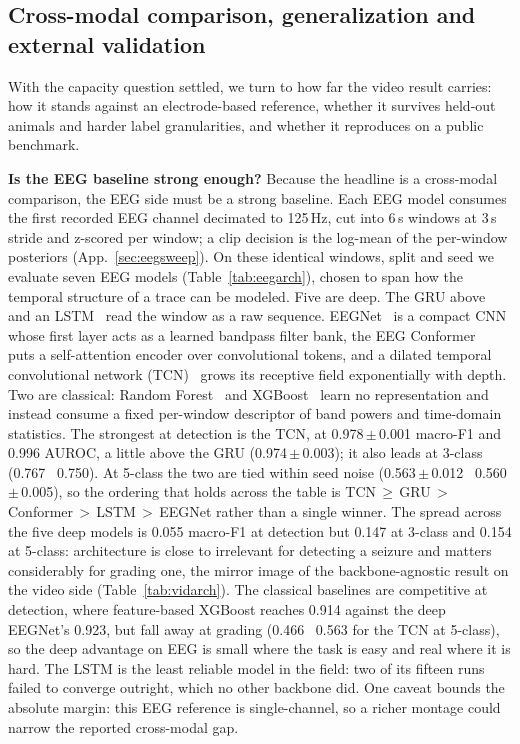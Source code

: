 \subsection{Cross-modal comparison, generalization and external validation}
\label{sec:crossmodal}

With the capacity question settled, we turn to how far the video result carries: how
it stands against an electrode-based reference, whether it survives held-out animals
and harder label granularities, and whether it reproduces on a public benchmark.

\noindent\textbf{Is the EEG baseline strong enough?}
Because the headline is a cross-modal comparison, the EEG side must be a strong
baseline. Each EEG model consumes the first recorded EEG channel decimated to
125\,Hz, cut into 6\,s windows at 3\,s stride and z-scored per window; a clip
decision is the log-mean of the per-window posteriors (App.~\ref{sec:eegsweep}). On these identical windows,
split and seed we evaluate seven EEG models (Table~\ref{tab:eegarch}), chosen to
span how the temporal structure of a trace can be modeled. Five are deep. The GRU above and an LSTM~\cite{hochreiter1997lstm} read the window as a raw sequence. EEGNet~\cite{lawhern2018eegnet} is a compact CNN whose first layer acts as a learned bandpass filter bank, the EEG Conformer~\cite{song2022conformer} puts a self-attention encoder over convolutional tokens, and a dilated temporal convolutional network (TCN)~\cite{bai2018tcn} grows its receptive field exponentially with depth. Two are classical: Random Forest~\cite{breiman2001rf} and
XGBoost~\cite{chen2016xgboost} learn no representation and instead consume a fixed
per-window descriptor of band powers and time-domain statistics. The strongest at detection is the TCN, at 0.978\,$\pm$\,0.001 macro-F1 and 0.996
AUROC, a little above the GRU (0.974\,$\pm$\,0.003); it also leads at 3-class
(0.767 \vs\ 0.750). At 5-class the two are tied within seed noise
(0.563\,$\pm$\,0.012 \vs\ 0.560\,$\pm$\,0.005), so the ordering that holds
across the table is TCN\,$\geq$\,GRU\,$>$\,Conformer\,$>$\,LSTM\,$>$\,EEGNet
rather than a single winner. The spread across the five deep models is
0.055 macro-F1 at detection but 0.147 at 3-class and 0.154 at 5-class: architecture
is close to irrelevant for detecting a seizure and matters considerably for grading
one, the mirror image of the backbone-agnostic result on the video side
(Table~\ref{tab:vidarch}). The classical baselines are competitive at detection,
where feature-based XGBoost reaches 0.914 against the deep EEGNet's 0.923, but fall
away at grading (0.466 \vs\ 0.563 for the TCN at 5-class), so the deep advantage on
EEG is small where the task is easy and real where it is hard. The LSTM is the least
reliable model in the field: two of its fifteen runs failed to converge outright,
which no other backbone did. One caveat bounds the absolute margin: this EEG
reference is single-channel, so a richer montage could narrow the reported
cross-modal gap.

